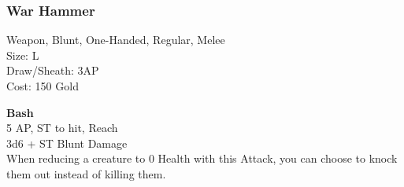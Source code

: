 \subsubsection{War Hammer}\label{weapon:warHammer}
Weapon, Blunt, One-Handed, Regular, Melee\\
Size: L\\
Draw/Sheath: 3AP\\
Cost: 150 Gold

\textbf{Bash}\\
5 AP, ST to hit,  Reach\\
3d6 + \texttimes ST Blunt Damage\\
When reducing a creature to 0 Health with this Attack, you can choose to knock them out instead of killing them.